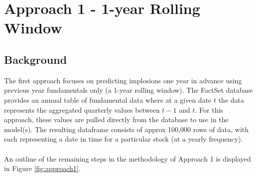 \documentclass[a4paper]{report}
\begin{document}
\section{Approach 1 - 1-year Rolling Window}
\subsection{Background} 
The first approach focuses on predicting implosions one year in advance using previous year fundamentals only (a 1-year rolling window). The FactSet database provides an annual table of fundamental data where at a given date \(t\) the data 
represents the aggregated quarterly values between \(t-1\) and \(t\). For this approach, these values are pulled directly from the database to use in the model(s). The resulting dataframe consists of approx 100,000 rows of data, with each representing a date in time for a particular stock (at a yearly frequency).\\\\An outline of the 
remaining steps in the methodology of Approach 1 is displayed in Figure \ref{fig:approach1}.


\end{document}
